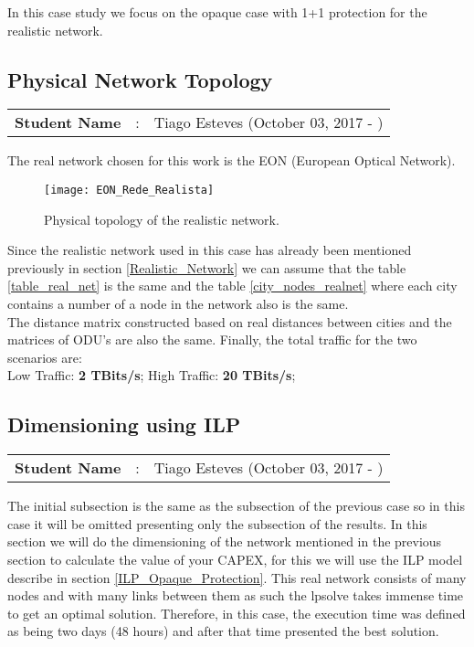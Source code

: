 In this case study we focus on the opaque case with 1+1 protection for the realistic network.

\subsection{Physical Network Topology}
\begin{tcolorbox}	
\begin{tabular}{p{2.75cm} p{0.2cm} p{10.5cm}} 	
\textbf{Student Name}  &:& Tiago Esteves    (October 03, 2017 - )\\
\end{tabular}
\end{tcolorbox}

The real network chosen for this work is the EON (European Optical Network).

\begin{figure}[h!]
\centering
\texttt{[image: EON\_Rede\_Realista]}
\caption{Physical topology of the realistic network.}
\end{figure}

Since the realistic network used in this case has already been mentioned previously in section \ref{Realistic_Network} we can assume that the table \ref{table_real_net} is the same and the table \ref{city_nodes_realnet} where each city contains a number of a node in the network also is the same.\\
The distance matrix constructed based on real distances between cities and the matrices of ODU's are also the same.
Finally, the total traffic for the two scenarios are:\\
Low Traffic: \textbf{2 TBits/s}; \quad High Traffic: \textbf{20 TBits/s};\\

\subsection{Dimensioning using ILP}
\begin{tcolorbox}	
\begin{tabular}{p{2.75cm} p{0.2cm} p{10.5cm}} 	
\textbf{Student Name}  &:& Tiago Esteves    (October 03, 2017 - )\\
\end{tabular}
\end{tcolorbox}

The initial subsection is the same as the subsection of the previous case so in this case it will be omitted presenting only the subsection of the results.
In this section we will do the dimensioning of the network mentioned in the previous section to calculate the value of your CAPEX, for this we will use the ILP model describe in section \ref{ILP_Opaque_Protection}.
This real network consists of many nodes and with many links between them as such the lpsolve takes immense time to get an optimal solution. Therefore, in this case, the execution time was defined as being two days (48 hours) and after that time presented the best solution.\\

